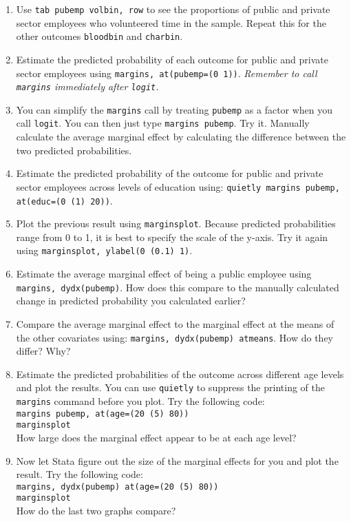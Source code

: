 \documentclass[a4paper,12pt]{article}
\begin{document}
\begin{enumerate}
\item Use \texttt{tab pubemp volbin, row} to see the proportions of public and private sector employees who volunteered time in the sample. Repeat this for the other outcomes \texttt{bloodbin} and \texttt{charbin}.
\item Estimate the predicted probability of each outcome for public and private sector employees using \texttt{margins, at(pubemp=(0 1))}. {\em Remember to call \texttt{margins} immediately after \texttt{logit}.}
\item You can simplify the \texttt{margins} call by treating \texttt{pubemp} as a factor when you call \texttt{logit}. You can then just type \texttt{margins pubemp}. Try it. Manually calculate the average marginal effect by calculating the difference between the two predicted probabilities.
\item Estimate the predicted probability of the outcome for public and private sector employees across levels of education using: \texttt{quietly margins pubemp, at(educ=(0 (1) 20))}.
\item Plot the previous result using \texttt{marginsplot}. Because predicted probabilities range from 0 to 1, it is best to specify the scale of the y-axis. Try it again using \texttt{marginsplot, ylabel(0 (0.1) 1)}.
\item Estimate the average marginal effect of being a public employee using \texttt{margins, dydx(pubemp)}. How does this compare to the manually calculated change in predicted probability you calculated earlier?
\item Compare the average marginal effect to the marginal effect at the means of the other covariates using: \texttt{margins, dydx(pubemp) atmeans}. How do they differ? Why?
\item Estimate the predicted probabilities of the outcome across different age levels and plot the results. You can use \texttt{quietly} to suppress the printing of the \texttt{margins} command before you plot. Try the following code:\\
\texttt{margins pubemp, at(age=(20 (5) 80))\\
marginsplot}\\
How large does the marginal effect appear to be at each age level?
\item Now let Stata figure out the size of the marginal effects for you and plot the result. Try the following code:\\
\texttt{margins, dydx(pubemp) at(age=(20 (5) 80))\\
marginsplot}\\
How do the last two graphs compare?
\end{enumerate}
\end{document}
